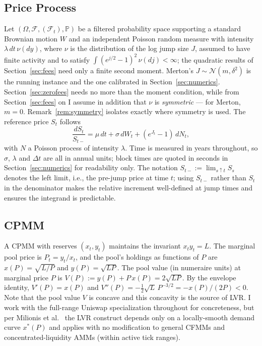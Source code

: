 \documentclass[runningheads]{llncs}
\newcommand{\Prob}{\mathbb{P}}
\newcommand{\dt}{\Delta t}
\newcommand{\1}{\mathbf{1}}
\begin{document}
\subsection{Price Process}
Let $(\Omega, \mathcal{F}, (\mathcal{F}_t), \Prob)$ be a filtered probability space supporting a standard Brownian motion $W$ and an independent Poisson random measure with intensity $\lambda \, dt \, \nu(dy)$, where $\nu$ is the distribution of the log jump size $J$, assumed to have finite activity and to satisfy $\int(e^{j/2}-1)^2\,\nu(dj)<\infty$; the quadratic results of Section~\ref{sec:fees} need only a finite second moment. Merton's $J \sim \mathcal{N}(m,\delta^2)$ is the running instance and the one calibrated in Section~\ref{sec:numerics}. Section~\ref{sec:zerofees} needs no more than the moment condition, while from Section~\ref{sec:fees} on I assume in addition that $\nu$ is \emph{symmetric} --- for Merton, $m=0$. Remark~\ref{rem:symmetry} isolates exactly where symmetry is used. The reference price $S_t$ follows
\begin{equation}\label{eq:merton}
\frac{dS_t}{S_{t-}} = \mu\,dt + \sigma \, dW_t + (e^{J_t} - 1)\,dN_t,
\end{equation}
with $N$ a Poisson process of intensity $\lambda$. Time is measured in years throughout, so $\sigma$, $\lambda$ and $\dt$ are all in annual units; block times are quoted in seconds in Section~\ref{sec:numerics} for readability only. The notation $S_{t-} := \lim_{s\uparrow t} S_s$ denotes the left limit, i.e., the pre-jump price at time $t$; using $S_{t-}$ rather than $S_t$ in the denominator makes the relative increment well-defined at jump times and ensures the integrand is predictable.

\subsection{CPMM}
A CPMM with reserves $(x_t, y_t)$ maintains the invariant $x_t y_t = L$. The marginal pool price is $P_t = y_t / x_t$, and the pool's holdings as functions of $P$ are $x(P) = \sqrt{L/P}$ and $y(P) = \sqrt{L P}$.
The pool value (in numeraire units) at marginal price $P$ is
$V(P) := y(P) + P\,x(P) = 2\sqrt{LP}$.
By the envelope identity, $V'(P) = x(P)$ and
$V''(P) = -\tfrac{1}{2}\sqrt{L}\,P^{-3/2} = -x(P)/(2P) < 0$.
Note that the pool value $V$ is concave and this concavity is the source of LVR. I work with the full-range Uniswap specialization throughout for concreteness, but per Milionis et al.~\cite[Remark~1]{milionis2022automated} the LVR construct depends only on a locally-smooth demand curve $x^*(P)$ and applies with no modification to general CFMMs and concentrated-liquidity AMMs (within active tick ranges).
\end{document}
